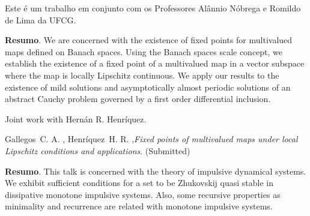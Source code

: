 	\vspace*{0.5cm} \noindent Este é um trabalho em conjunto com os Professores Alânnio Nóbrega e Romildo  de Lima da UFCG.
	
	\vspace{24pt}


	\noindent\textbf{Resumo}.\label{cag} 
	We are concerned with the  existence of fixed points for multivalued maps defined on Banach spaces.
	Using the Banach spaces scale concept, we  establish the existence of a fixed point of a multivalued map in a vector subspace where the map is locally Lipschitz continuous. We apply our results to the existence of mild solutions and asymptotically almost periodic solutions of an abstract Cauchy problem governed by a first order  differential inclusion.

\vspace*{0.5cm} \noindent Joint work with Hern\'an R. Henr\'iquez.
	

\begin{thebibliography}{999}
	 Gallegos~C. A. , Henr\'iquez~H. R. ,{\it Fixed points of multivalued maps under local Lipschitz conditions and applications}. (Submitted)
\end{thebibliography}

	\vspace{24pt}

	
	
	\noindent\textbf{Resumo}.\label{emb} 
	This talk is concerned with the theory of impulsive dynamical systems.
	We exhibit sufficient conditions for a set to be Zhukovskij quasi stable in dissipative monotone impulsive systems. Also, some recursive properties as minimality and recurrence are related
	with monotone impulsive systems.
	
	
